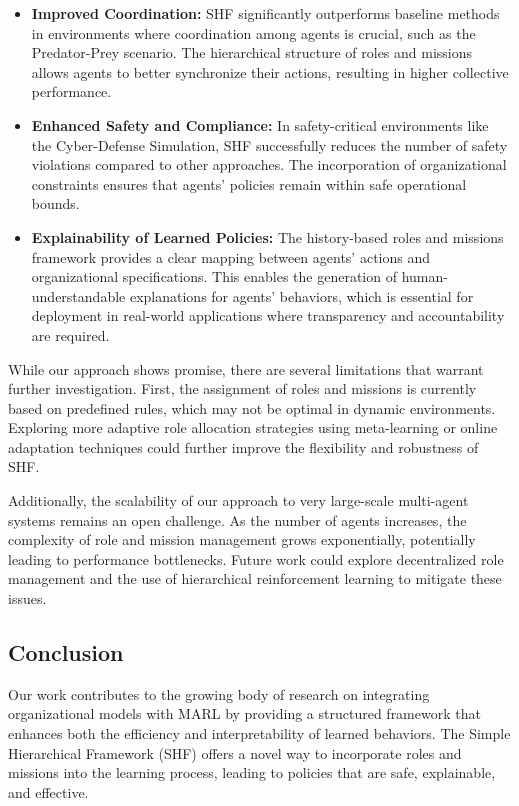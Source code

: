 \documentclass[sigconf,anonymous]{aamas}
\begin{document}
\begin{itemize}
    \item \textbf{Improved Coordination:} SHF significantly outperforms baseline methods in environments where coordination among agents is crucial, such as the Predator-Prey scenario. The hierarchical structure of roles and missions allows agents to better synchronize their actions, resulting in higher collective performance.
    \item \textbf{Enhanced Safety and Compliance:} In safety-critical environments like the Cyber-Defense Simulation, SHF successfully reduces the number of safety violations compared to other approaches. The incorporation of organizational constraints ensures that agents' policies remain within safe operational bounds.
    \item \textbf{Explainability of Learned Policies:} The history-based roles and missions framework provides a clear mapping between agents' actions and organizational specifications. This enables the generation of human-understandable explanations for agents' behaviors, which is essential for deployment in real-world applications where transparency and accountability are required.
\end{itemize}

While our approach shows promise, there are several limitations that warrant further investigation. First, the assignment of roles and missions is currently based on predefined rules, which may not be optimal in dynamic environments. Exploring more adaptive role allocation strategies using meta-learning or online adaptation techniques could further improve the flexibility and robustness of SHF.

Additionally, the scalability of our approach to very large-scale multi-agent systems remains an open challenge. As the number of agents increases, the complexity of role and mission management grows exponentially, potentially leading to performance bottlenecks. Future work could explore decentralized role management and the use of hierarchical reinforcement learning to mitigate these issues.

\subsection{Conclusion}
Our work contributes to the growing body of research on integrating organizational models with MARL by providing a structured framework that enhances both the efficiency and interpretability of learned behaviors. The Simple Hierarchical Framework (SHF) offers a novel way to incorporate roles and missions into the learning process, leading to policies that are safe, explainable, and effective.
\end{document}
